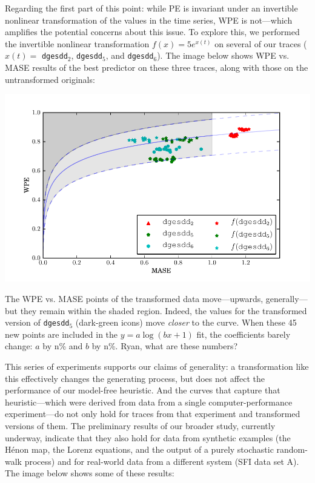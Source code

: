 \documentclass[12pt]{article}
\newcommand{\alert}[1]{{\color{red}#1}}
\begin{document}
Regarding the first part of this point: while PE is invariant under an
invertible nonlinear transformation of the values in the time series,
WPE is not---which amplifies the potential concerns about this issue.
To explore this, we performed the invertible nonlinear transformation
$f(x)=5e^{x(t)}$ on several of our traces ($x(t)=$ {\tt dgesdd}$_2$,
{\tt dgesdd}$_5$, and {\tt dgesdd}$_6$).  The image below shows WPE
vs. MASE results of the best predictor on these three traces, along
with those on the untransformed originals:

\begin{center}
    \includegraphics[width=0.8\columnwidth]{figs/nonlinear_transform_data}
\end{center}

The WPE vs. MASE points of the transformed data move---upwards,
generally---but they remain within the shaded region.  Indeed, the
values for the transformed version of {\tt dgesdd}$_5$ (dark-green
icons) move {\sl closer} to the curve.  When these 45 new points are
included in the $y = a \log(b x + 1)$ fit, the coefficients
\alert{barely change: $a$ by n\% and $b$ by n\%.  Ryan, what are these
  numbers?}

This series of experiments supports our claims of generality: a
transformation like this effectively changes the generating process,
but does not affect the performance of our model-free heuristic.  And
the curves that capture that heuristic---which were derived from data
from a single computer-performance experiment---do not only hold for
traces from that experiment and transformed versions of them.  The
preliminary results of our broader study, currently underway, indicate
that they also hold for data from synthetic examples (the H\'{e}non
map, the Lorenz equations, and the output of a purely stochastic
random-walk process) and for real-world data from a different system
(SFI data set A).  The image below shows some of these results:
\end{document}
